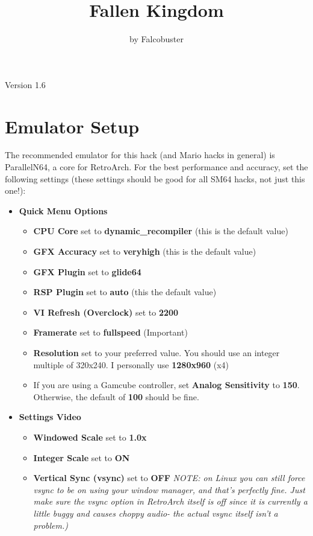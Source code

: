 \documentclass[11pt]{article}
\title{\textbf{Fallen Kingdom}}
\author{by Falcobuster}
\date{}
\begin{document}
\maketitle

Version 1.6

\section{Emulator Setup}

The recommended emulator for this hack (and Mario hacks in general) is ParallelN64, a core for RetroArch. For the best performance and accuracy, set the following settings (these settings should be good for all SM64 hacks, not just this one!):
\begin{itemize}
	\item \textbf{Quick Menu \textrightarrow Options}
	\begin{itemize}
		\item \textbf{CPU Core} set to \textbf{dynamic_recompiler} (this is the default value)
		\item \textbf{GFX Accuracy} set to \textbf{veryhigh} (this is the default value)
		\item \textbf{GFX Plugin} set to \textbf{glide64}
		\item \textbf{RSP Plugin} set to \textbf{auto} (this the default value)
		\item \textbf{VI Refresh (Overclock)} set to \textbf{2200}
		\item \textbf{Framerate} set to \textbf{fullspeed} {\color{red} (Important)}
		\item \textbf{Resolution} set to your preferred value. You should use an integer multiple of 320x240. I personally use \textbf{1280x960} (x4)
		\item If you are using a Gamcube controller, set \textbf{Analog Sensitivity} to \textbf{150}. Otherwise, the default of \textbf{100} should be fine.
	\end{itemize}
	\item \textbf{Settings \textrightarrow Video}
	\begin{itemize}
		\item \textbf{Windowed Scale} set to \textbf{1.0x}
		\item \textbf{Integer Scale} set to \textbf{ON}
		\item \textbf{Vertical Sync (vsync)} set to \textbf{OFF} \textit{NOTE: on Linux you can still force vsync to be on using your window manager, and that's perfectly fine. Just make sure the vsync option in RetroArch itself is off since it is currently a little buggy and causes choppy audio- the actual vsync itself isn't a problem.)}
	\end{itemize}
\end{itemize}
\end{document}
